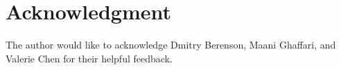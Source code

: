 \documentclass[journal]{IEEEtran}
\begin{document}




\section*{Acknowledgment}
The author would like to acknowledge Dmitry Berenson, Maani Ghaffari, and Valerie Chen for their helpful feedback.

\ifCLASSOPTIONcaptionsoff
  \newpage
\fi




\end{document}

